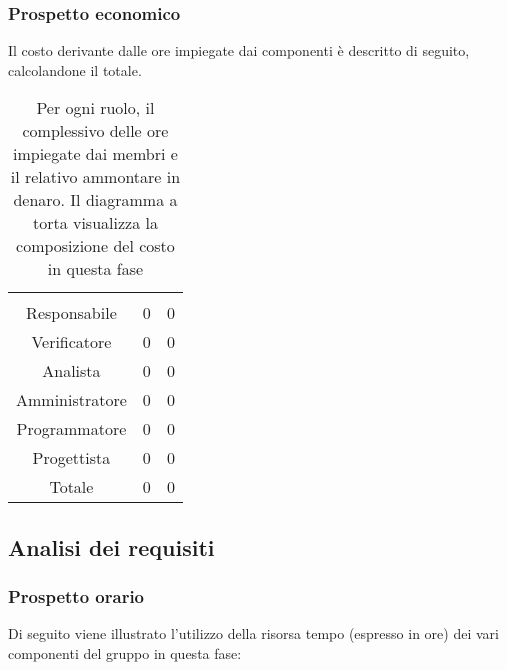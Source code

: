 \subsubsection{Prospetto economico}
Il costo derivante dalle ore impiegate dai componenti è descritto di seguito, calcolandone il totale.

\begin{table}[H]
{\setlength{\parindent}{0cm}
\begin{minipage}{.43\textwidth}
	\begin{tabular}{ccc}
	\rowcolorhead
	\headertitle{Ruolo} & \headertitle{Ore} & \headertitle{Costo(€)}\\
	Responsabile & 0 & 0\\
	Verificatore & 0 & 0\\
	Analista & 0 & 0\\
	Amministratore & 0 & 0\\
	Programmatore & 0 & 0\\
	Progettista & 0 & 0\\
	\hline
	Totale & 0& 0\\
	\end{tabular}
\end{minipage}%
\begin{minipage}{.57\textwidth}
\end{minipage} }
\caption{Per ogni ruolo, il complessivo delle ore impiegate dai membri e il relativo ammontare in denaro. Il diagramma a torta visualizza la composizione del costo in questa fase}
\end{table}



\subsection{Analisi dei requisiti}

\subsubsection{Prospetto orario}
Di seguito viene illustrato l'utilizzo della risorsa tempo (espresso in ore) dei vari componenti del gruppo in questa fase:

